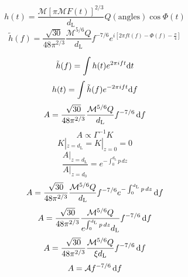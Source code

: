 \cite{Poisson1995}
\begin{equation}
    h(t)=\frac{\mathcal{M}[\pi \mathcal{M}F(t)]^{2/3}}{d_\text{L}}Q(\text{angles})\cos\Phi(t)
\end{equation}
\begin{equation}
    \tilde{h}(f)=\frac{\sqrt{30}}{48\pi^{2/3}}\frac{\mathcal{M}^{5/6}Q}{d_\text{L}}f^{-7/6}e^{i[2\pi ft(f)-\Phi(f)-\frac{\pi}{4}]}
\end{equation}
\begin{comment}
\begin{equation}
    \tilde{h}(\frac{\omega}{2\pi})=\frac{\sqrt{30}}{48\pi^{2/3}}\frac{\mathcal{M}^{5/6}Q}{\xi\,d_\text{L}}(\frac{\omega}{2\pi})^{-7/6}e^{i[2\pi ft(\frac{\omega}{2\pi})-\Phi(\frac{\omega}{2\pi})-\frac{\pi}{4}]}
\end{equation}
\end{comment}
\begin{equation}
    \tilde{h}(f)=\int h(t)e^{2\pi i f t}\mathrm{d} t
\end{equation}
\begin{equation}
    h(t)=\int \tilde{h}(f)e^{-2\pi i f t}\mathrm{d} f
\end{equation}
\begin{equation}
    A=\frac{\sqrt{30}}{48\pi^{2/3}}\frac{\mathcal{M}^{5/6}Q}{d_\text{L}}f^{-7/6}\,\mathrm{d} f
\end{equation}
\begin{equation}
    A\propto\Gamma^{-1}K
\end{equation}
\begin{equation}
    K|_{z=d_\text{L}}=K|_{z=0}=0
\end{equation}
\begin{equation}
    \frac{A|_{z=d_\text{L}}}{A|_{z=d_0}}=e^{-\int_0^{d_\text{L}}p\,d z}
\end{equation}
\begin{equation}
    A=\frac{\sqrt{30}}{48\pi^{2/3}}\frac{\mathcal{M}^{5/6}Q}{d_\text{L}}f^{-7/6}e^{-\int_0^{d_\text{L}}p\,d z}\,\mathrm{d} f
\end{equation}
\begin{equation}
    A=\frac{\sqrt{30}}{48\pi^{2/3}}\frac{\mathcal{M}^{5/6}Q}{e^{\int_0^{d_\text{L}}p\,d z}d_\text{L}}f^{-7/6}\,\mathrm{d} f
\end{equation}
\begin{equation}
    A=\frac{\sqrt{30}}{48\pi^{2/3}}\frac{\mathcal{M}^{5/6}Q}{\xi d_\text{L}}f^{-7/6}\,\mathrm{d} f
\end{equation}
\begin{equation}
    A=\mathcal{A}f^{-7/6}\,\mathrm{d} f
\end{equation}
